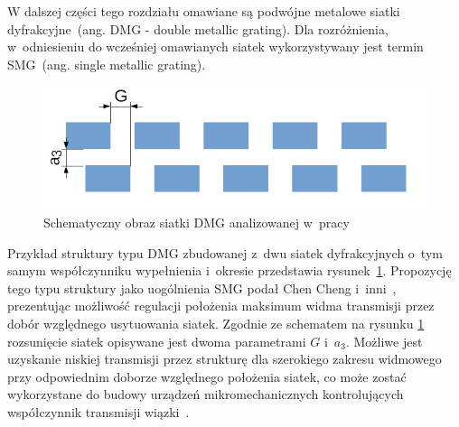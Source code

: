 W dalszej części tego rozdziału omawiane są podwójne metalowe siatki dyfrakcyjne~(ang. DMG - double metallic grating). Dla rozróżnienia, w~odniesieniu do wcześniej omawianych siatek wykorzystywany jest termin SMG~(ang. single metallic grating).

\begin{figure}[tb]
	\includegraphics[width=\textwidth]{images/dmg/dmg_general_schem.png}
	\caption{Schematyczny obraz siatki DMG analizowanej w~pracy~\cite{cheng2007controllable}}
	\label{fig:cheng_dmg_schem}
\end{figure}

Przykład struktury typu DMG zbudowanej z~dwu siatek dyfrakcyjnych o~tym samym współczynniku wypełnienia i~okresie przedstawia rysunek~\ref{fig:cheng_dmg_schem}. Propozycję tego typu struktury jako uogólnienia SMG podał Chen Cheng i~inni~\cite{cheng2007controllable}, prezentując możliwość regulacji położenia maksimum widma transmisji przez dobór względnego usytuowania siatek. Zgodnie ze schematem na rysunku \ref{fig:cheng_dmg_schem} rozsunięcie siatek opisywane jest dwoma parametrami $G$ i~$a_3$. Możliwe jest uzyskanie niskiej transmisji przez strukturę dla szerokiego zakresu widmowego przy odpowiednim doborze względnego położenia siatek, co może zostać wykorzystane do budowy urządzeń mikromechanicznych kontrolujących współczynnik transmisji wiązki~\cite{cheng2007controllable}.

